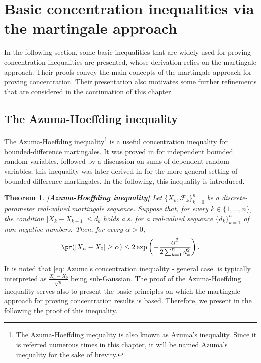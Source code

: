 \documentclass{article}
\theoremstyle{plain}
\newtheorem{theorem}{Theorem}[section]
\begin{document}
\section{Basic concentration inequalities via the martingale approach}
\label{section: Two Basic Concentration Inequalities}
In the following section, some basic inequalities that are widely
used for proving concentration inequalities are presented, whose
derivation relies on the martingale approach. Their proofs convey
the main concepts of the martingale approach for proving concentration.
Their presentation also motivates some further refinements that are
considered in the continuation of this chapter.

\subsection{The Azuma-Hoeffding inequality}
\label{subsection: Azuma's inequality}
The Azuma-Hoeffding inequality\footnote{The
Azuma-Hoeffding inequality is also known as Azuma's inequality.
Since it is referred numerous times in this chapter, it will be
named Azuma's inequality for the sake of
brevity.} is a useful concentration inequality for
bounded-difference martingales. It was proved in \cite{Hoeffding}
for independent bounded random variables, followed by a discussion
on sums of dependent random variables; this inequality was later
derived in \cite{Azuma} for the more general setting of
bounded-difference martingales. In the following, this inequality
is introduced.

\begin{theorem}{\bf[Azuma-Hoeffding inequality]}
Let $\{X_k, \mathcal{F}_k\}_{k=0}^n$
be a discrete-parameter real-valued martingale sequence.
Suppose that, for every $k \in \{1, \ldots, n\}$, the condition
$ |X_k - X_{k-1}| \leq d_k$
holds a.s. for a real-valued sequence $\{d_k\}_{k=1}^n$ of
non-negative numbers. Then, for every $\alpha > 0$,
\begin{equation}
\pr( | X_n - X_0 | \geq \alpha) \leq 2 \exp\left(-\frac{\alpha^2}{2
\sum_{k=1}^n d_k^2}\right).
\label{eq: Azuma's concentration inequality - general case}
\end{equation}
\label{theorem: Azuma's concentration inequality}
\end{theorem}

It is noted that \eqref{eq: Azuma's concentration inequality - general case}
is typically interpreted as $\frac{X_n - X_0}{\sqrt{n}}$ being sub-Gaussian.
The proof of the Azuma-Hoeffding inequality serves also
to present the basic principles on which the martingale
approach for proving concentration results is based.
Therefore, we present in the following the proof of this
inequality.
\end{document}
